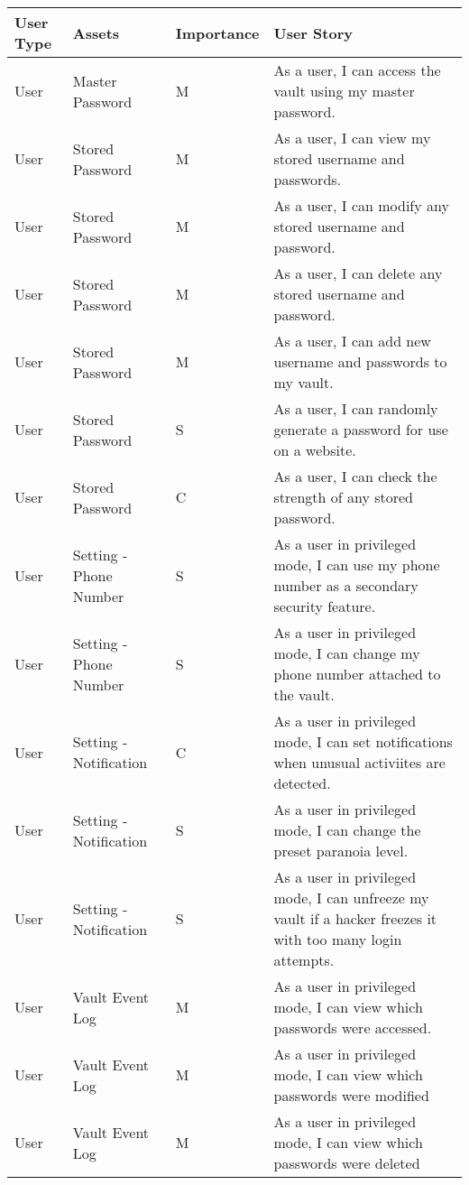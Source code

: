\documentclass{article}
\begin{document}
\begin{table}[H]
  \centering
  {
    \renewcommand\arraystretch{1.25}
    \begin{tabular}{>{\centering}m{1cm} >{\centering}m{4cm} >{\centering}m{2cm} >{\centering\arraybackslash}m{8cm} }
    \toprule
    User Type & Assets & Importance & User Story \\
    \midrule
    User & Master Password & M & As a user, I can access the vault using my master password. \\
    User & Stored Password & M & As a user, I can view my stored username and passwords. \\
    User & Stored Password & M & As a user, I can modify any stored username and password. \\
    User & Stored Password & M & As a user, I can delete any stored username and password. \\
    User & Stored Password & M & As a user, I can add new username and passwords to my vault. \\
    User & Stored Password & S & As a user, I can randomly generate a password for use on a website. \\
    User & Stored Password & C & As a user, I can check the strength of any stored password. \\
    User & Setting - Phone Number & S & As a user in privileged mode, I can use my phone number as a secondary security feature. \\
    User & Setting - Phone Number & S & As a user in privileged mode, I can change my phone number attached to the vault. \\
    User & Setting - Notification & C & As a user in privileged mode, I can set notifications when unusual activiites are detected. \\
    User & Setting - Notification & S &  As a user in privileged mode, I can change the preset paranoia level. \\
    User & Setting - Notification & S & As a user in privileged mode, I can unfreeze my vault if a hacker freezes it with too many login attempts. \\
    User & Vault Event Log & M & As a user in privileged mode, I can view which passwords were accessed. \\
    User & Vault Event Log & M & As a user in privileged mode, I can view which passwords were modified \\
    User & Vault Event Log & M & As a user in privileged mode, I can view which passwords were deleted \\

\end{tabular}}
\end{table}
\end{document}
